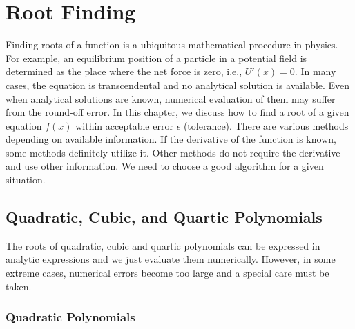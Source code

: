 \chapter{Root Finding}\label{ch:root-finding}
 
\normalsize

Finding roots of a function is a ubiquitous mathematical procedure in physics. For example, an equilibrium position of a particle in a potential field is determined as the place where the net force is zero, i.e., $U'(x)=0$. In many cases, the equation is transcendental and no analytical solution is available. Even when analytical solutions are known, numerical evaluation of them may suffer from the round-off error.  In this chapter,  we discuss how to find a root of a given equation $f(x)$ within acceptable error $\epsilon$ (tolerance). There are various methods depending on available information. If the derivative of the function is known, some methods definitely utilize it. Other methods do not require the derivative and use other information.  We need to choose a good algorithm for a given situation.

\noindent
\section{Quadratic, Cubic, and Quartic Polynomials}

The roots of quadratic, cubic and quartic polynomials can be expressed in analytic expressions and we just evaluate them numerically. However, in some extreme cases, numerical errors become too large and a special care must be taken.

\noindent
\subsection{Quadratic Polynomials}

